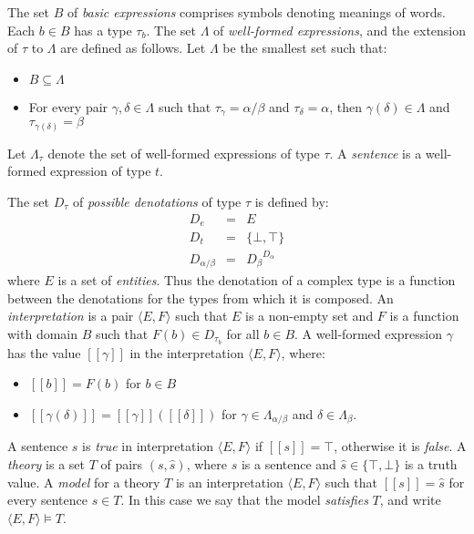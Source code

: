 \documentclass[a4paper,11pt]{article}
\theoremstyle{definition}
\newcommand{\interp}[1]{[\![ #1 ]\!]}
\begin{document}
The set $B$ of \emph{basic expressions} comprises
symbols denoting meanings of words. Each $b\in B$ has a type $\tau_b$. The set $\Lambda$ of
\emph{well-formed expressions}, and the extension of $\tau$ to $\Lambda$ are
defined as follows. Let $\Lambda$ be the smallest set such that:

\begin{itemize}
\item $B\subseteq \Lambda$
\item For every pair $\gamma,\delta\in \Lambda$ such that $\tau_\gamma
  = \alpha/\beta$ and $\tau_\delta = \alpha$, then $\gamma(\delta)\in
  \Lambda$ and $\tau_{\gamma(\delta)} = \beta$
\end{itemize}
Let $\Lambda_\tau$ denote the set of well-formed expressions of type
$\tau$. A \emph{sentence} is a well-formed expression of type $t$.


The set $D_\tau$ of \emph{possible denotations} of type $\tau$ is
defined by:
\begin{eqnarray*}
D_e &=& E\\
D_t &=& \{\bot,\top\}\\
D_{\alpha/\beta} &=& {D_\beta}^{D_\alpha}
\end{eqnarray*}
where $E$ is a set of \emph{entities}. Thus the denotation of a
complex type is a function between the denotations for the types from
which it is composed. An \emph{interpretation} is a pair $\langle E,
F\rangle$ such that $E$ is a non-empty set and $F$ is a function with
domain $B$ such that $F(b) \in D_{\tau_b}$ for all $b\in B$. A well-formed expression $\gamma$ has the value $\interp{\gamma}$ in the
interpretation $\langle E, F\rangle$, where:
\begin{itemize}
\item $\interp{b} = F(b)$ for $b\in B$
\item $\interp{\gamma(\delta)} = \interp{\gamma}(\interp{\delta})$ for $\gamma
  \in \Lambda_{\alpha/\beta}$ and $\delta \in \Lambda_\beta$.
\end{itemize}
A sentence $s$ is \emph{true} in interpretation $\langle E, F\rangle$
if $\interp{s} = \top$, otherwise it is \emph{false}. A \emph{theory} is a set $T$ of pairs $(s,\hat{s})$, where $s$ is a
sentence and $\hat{s}\in\{\top,\bot\}$ is a truth value. A
\emph{model} for a theory $T$ is an interpretation $\langle E,
F\rangle$ such that $\interp{s} = \hat{s}$ for every sentence $s\in
T$. In this case we say that the model \emph{satisfies} $T$, and write
$\langle E, F\rangle \models T$.
\end{document}
